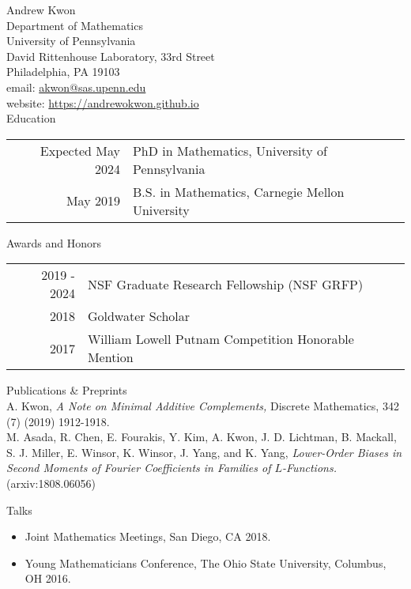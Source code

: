 \documentclass{article}
\begin{document}
\LARGE{Andrew Kwon}\vspace{0.0in}\\

\normalsize
Department of Mathematics\\
University of Pennsylvania\\
David Rittenhouse Laboratory, 33rd Street\\
Philadelphia, PA 19103\\

email: \href{mailto:akwon@sas.upenn.edu}{akwon@sas.upenn.edu}\\
website: \url{https://andrewokwon.github.io}\vspace{0.25in}\\

\Large{Education}\vspace{0.2in}\\
\normalsize
\begin{tabular}{r l}
	Expected May 2024 & PhD in Mathematics, University of Pennsylvania\\
	May 2019 & B.S. in Mathematics, Carnegie Mellon University
\end{tabular}
\vspace{0.25in}

\Large{Awards and Honors}\vspace{0.2in}\\
\normalsize
\begin{tabular}{r l}
	2019 - 2024 & NSF Graduate Research Fellowship (NSF GRFP)\\
	2018 & Goldwater Scholar\\
	2017 & William Lowell Putnam Competition Honorable Mention
\end{tabular}
\vspace{0.25in}

\Large{Publications \& Preprints}\vspace{0.2in}\\
\normalsize
A. Kwon, \textit{A Note on Minimal Additive Complements,} Discrete Mathematics, 342 (7) (2019) 1912-1918.\\

M. Asada, R. Chen, E. Fourakis, Y. Kim, A. Kwon, J. D. Lichtman, B. Mackall, S. J. Miller, E. Winsor, K. Winsor, J. Yang, and K. Yang, \textit{Lower-Order Biases in Second Moments of Fourier Coefficients in Families of $L$-Functions.} (arxiv:1808.06056)

\vspace{0.25in}
\Large{Talks}\\
\normalsize
\begin{itemize}
	\item Joint Mathematics Meetings, San Diego, CA 2018. 
	\item Young Mathematicians Conference, The Ohio State University, Columbus, OH 2016.
\end{itemize}
\end{document}

